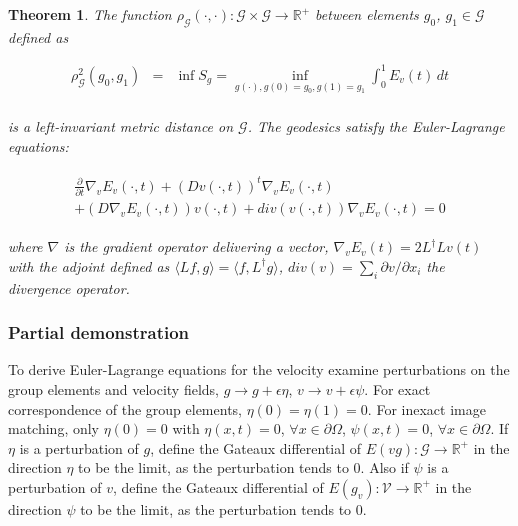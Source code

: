 \documentclass[final, paper=letter,5p,times,twocolumn]{elsarticle}
\newtheorem{theorem}{Theorem} %
\theoremstyle{definition}
\begin{document}
\begin{theorem}
  The function $\rho_{\mathcal{G}}(\cdot, \cdot): \mathcal{G} \times \mathcal{G} \rightarrow \mathbb{R}^{+}$ between elements $g_{0}$, $g_{1} \in \mathcal{G}$ defined as



\begin{eqnarray*}
  \rho_{\mathcal{G}}^{2}(g_{0}, g_{1}) & = & \inf S_{g} = \underset{g(\cdot), g(0)=g_{0}, g(1) = g_{1}}{\inf} \int_{0}^{1} E_{v}(t) \, dt \\
\end{eqnarray*}


is a left-invariant metric distance on $\mathcal{G}$. The geodesics satisfy the Euler-Lagrange equations:

\begin{eqnarray}
  \begin{array}{l}
  \frac{\partial}{\partial t} \nabla_{v}E_{v}(\cdot, t) + (Dv(\cdot, t))^{t} \nabla_{v}E_{v}(\cdot, t) \\
  + (D \nabla_{v}E_{v}(\cdot, t))v(\cdot, t) + div( v(\cdot, t)) \nabla_{v}E_{v}(\cdot, t) = 0
  \end{array}
  \label{Euler_Lagrange}
\end{eqnarray}

where $\nabla$ is the gradient operator delivering a vector, $\nabla_{v}E_{v}(t) = 2L^{\dag}Lv(t)$ with the adjoint defined as $\langle Lf, g\rangle = \langle f, L^{\dag}g \rangle$, $div(v) = \sum_{i} \partial v/ \partial x_{i}$ the divergence operator.
\end{theorem}



\subsubsection{Partial demonstration}

To derive Euler-Lagrange equations for the velocity examine perturbations on the group elements and velocity fields, $g \rightarrow g + \epsilon \eta$, $v \rightarrow v + \epsilon \psi$. For exact correspondence of the group elements, $\eta(0) = \eta(1) = 0$. For inexact image matching, only $\eta(0) = 0$ with $\eta(x, t) = 0$, $\forall x \in \partial \Omega$, $\psi(x, t) = 0$, $\forall x \in \partial \Omega$. If $\eta$ is a perturbation of $g$, define the Gateaux differential of $E(v g): \mathcal{G} \rightarrow \mathbb{R}^{+}$ in the direction $\eta$ to be the limit, as the perturbation tends to 0. Also if $\psi$ is a perturbation of $v$, define the Gateaux differential of $E(g_{v}): \mathcal{V} \rightarrow \mathbb{R}^{+}$ in the direction $\psi$ to be the limit, as the perturbation tends to 0.
\end{document}
